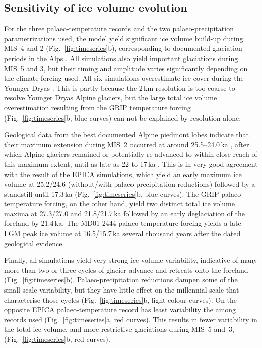 \documentclass[tc, manuscript]{copernicus}
\begin{document}
\subsection{Sensitivity of ice volume evolution}
\label{sec:timeseries}

    For the three palaeo-temperature records and the two palaeo-precipitation
    parametrizations used, the model yield significant ice volume build-up
    during MIS~4 and 2 (Fig.~\ref{fig:timeseries}b), corresponding to documented
    glaciation periods in the Alps \citep{Preusser.2004, Ivy-Ochs.etal.2008}.
    All simulations also yield important glaciations during MIS~5 and 3, but
    their timing and amplitude varies significantly depending on the climate
    forcing used. All six simulations overestimate
    ice cover during the Younger Dryas \citep[cf. e.g.,][]{Ivy-Ochs.etal.2009}.
    This is partly because the 2\,km resolution is too coarse to resolve
    Younger Dryas Alpine glaciers, but the large total ice volume
    overestimation resulting from the GRIP temperature forcing
    (Fig.~\ref{fig:timeseries}b, blue curves) can not be explained by
    resolution alone.

    Geological data from the best documented Alpine piedmont lobes indicate
    that their maximum extension during MIS~2 occurred at around 25.5--24.0\,ka
    \citep{Monegato.etal.2017}, after which Alpine glaciers remained or
    potentially re-advanced to within close reach of this maximum extent, until
    as late as 22 to 17\,ka \citep[Fig.~5]{Wirsig.etal.2016}. This is in very
    good agreement with the result of the EPICA simulations, which yield an
    early maximum ice volume at 25.2/24.6 (without/with palaeo-precipitation
    reductions) followed by a standstill until 17.3\,ka
    (Fig.~\ref{fig:timeseries}b, blue curves). The GRIP palaeo-temperature
    forcing, on the other hand, yield two distinct total ice volume maxima
    at 27.3/27.0 and 21.8/21.7\,ka followed by an early deglaciation of the
    foreland by 21.4\,ka. The MD01-2444 palaeo-temperature forcing yields
    a late LGM peak ice volume at 16.5/15.7\,ka several thousand years after
    the dated geological evidence.

    Finally, all simulations yield very strong ice volume
    variability, indicative of many more than two or three cycles of glacier
    advance and retreats onto the foreland (Fig.~\ref{fig:timeseries}b).
    Palaeo-precipitation reductions dampen some of the small-scale variability,
    but they have little effect on the millennial scale that characterise those
    cycles (Fig.~\ref{fig:timeseries}b, light colour curves). On the opposite
    EPICA palaeo-temperature record has least variability the among records
    used (Fig.~\ref{fig:timeseries}a, red curves). This results in fewer
    variability in the total ice volume, and more restrictive glaciations
    during MIS~5 and~3, (Fig.~\ref{fig:timeseries}b, red curves).
\end{document}
